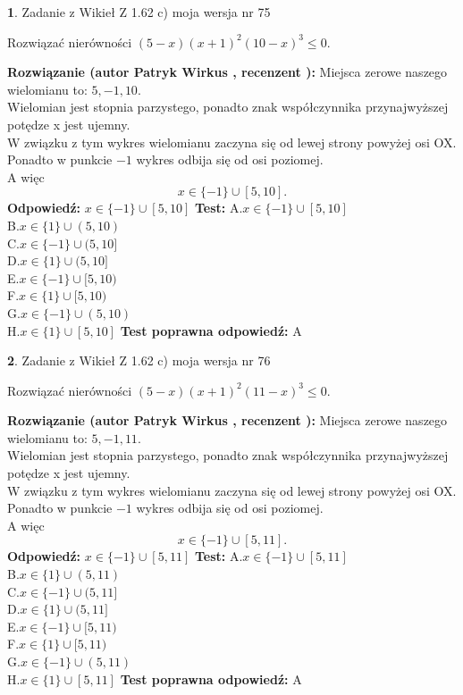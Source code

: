 \documentclass[12pt, a4paper]{article}
\theoremstyle{definition} %
\newtheorem{zad}{}
\newcommand{\zadStart}[1]{\begin{zad}#1\newline}
\newcommand{\zadStop}{\end{zad}}
\newcommand{\rozwStart}[2]{\noindent \textbf{Rozwiązanie (autor #1 , recenzent #2): }\newline}
\newcommand{\rozwStop}{\newline}
\newcommand{\odpStart}{\noindent \textbf{Odpowiedź:}\newline}
\newcommand{\odpStop}{\newline}
\newcommand{\testStart}{\noindent \textbf{Test:}\newline}
\newcommand{\testStop}{\newline}
\newcommand{\kluczStart}{\noindent \textbf{Test poprawna odpowiedź:}\newline}
\newcommand{\kluczStop}{\newline}
\begin{document}
\zadStart{Zadanie z Wikieł Z 1.62 c) moja wersja nr 75}

Rozwiązać nierówności $(5-x)(x+1)^{2}(10-x)^{3}\le0$.
\zadStop
\rozwStart{Patryk Wirkus}{}
Miejsca zerowe naszego wielomianu to: $5, -1, 10$.\\
Wielomian jest stopnia parzystego, ponadto znak współczynnika przy\linebreak najwyższej potędze x jest ujemny.\\ W związku z tym wykres wielomianu zaczyna się od lewej strony powyżej osi OX.\\
Ponadto w punkcie $-1$ wykres odbija się od osi poziomej.\\
A więc $$x \in \{-1\} \cup [5,10].$$
\rozwStop
\odpStart
$x \in \{-1\} \cup [5,10]$
\odpStop
\testStart
A.$x \in \{-1\} \cup [5,10]$\\
B.$x \in \{1\} \cup (5,10)$\\
C.$x \in \{-1\} \cup (5,10]$\\
D.$x \in \{1\} \cup (5,10]$\\
E.$x \in \{-1\} \cup [5,10)$\\
F.$x \in \{1\} \cup [5,10)$\\
G.$x \in \{-1\} \cup (5,10)$\\
H.$x \in \{1\} \cup [5,10]$
\testStop
\kluczStart
A
\kluczStop



\zadStart{Zadanie z Wikieł Z 1.62 c) moja wersja nr 76}

Rozwiązać nierówności $(5-x)(x+1)^{2}(11-x)^{3}\le0$.
\zadStop
\rozwStart{Patryk Wirkus}{}
Miejsca zerowe naszego wielomianu to: $5, -1, 11$.\\
Wielomian jest stopnia parzystego, ponadto znak współczynnika przy\linebreak najwyższej potędze x jest ujemny.\\ W związku z tym wykres wielomianu zaczyna się od lewej strony powyżej osi OX.\\
Ponadto w punkcie $-1$ wykres odbija się od osi poziomej.\\
A więc $$x \in \{-1\} \cup [5,11].$$
\rozwStop
\odpStart
$x \in \{-1\} \cup [5,11]$
\odpStop
\testStart
A.$x \in \{-1\} \cup [5,11]$\\
B.$x \in \{1\} \cup (5,11)$\\
C.$x \in \{-1\} \cup (5,11]$\\
D.$x \in \{1\} \cup (5,11]$\\
E.$x \in \{-1\} \cup [5,11)$\\
F.$x \in \{1\} \cup [5,11)$\\
G.$x \in \{-1\} \cup (5,11)$\\
H.$x \in \{1\} \cup [5,11]$
\testStop
\kluczStart
A
\kluczStop
\end{document}
